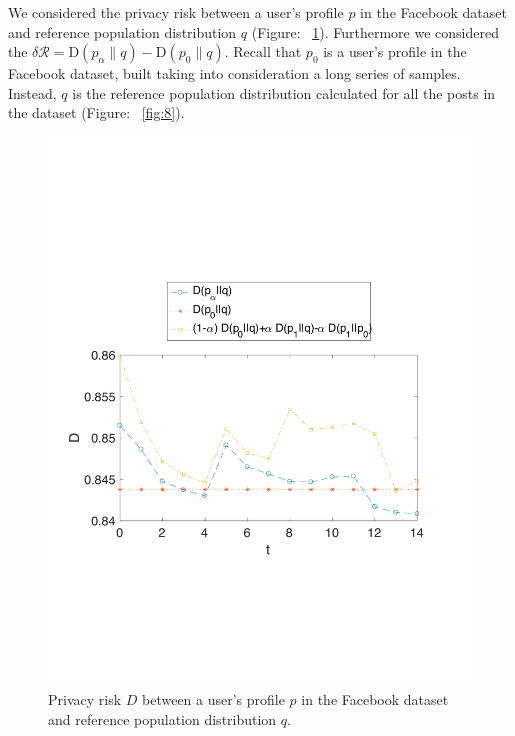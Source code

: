 We considered the privacy risk between a user's profile $p$ in the Facebook dataset and reference population distribution $q$ (Figure: ~\ref{fig:7}). Furthermore we considered the $\delta \mathcal{R} = \text{D}(p_\alpha\|q) - \text{D}(p_0\|q)$. Recall that $p_0$ is a user's profile in the Facebook dataset, built taking into consideration a long series of samples. Instead, $q$ is the reference population distribution calculated for all the posts in the dataset (Figure: ~\ref{fig:8}).

\begin{figure}[htb]
\centering
\includegraphics[scale=0.5]{figures/experiment1.pdf}
\caption{Privacy risk $D$ between a user's profile $p$ in the Facebook dataset and reference population distribution $q$.}
\label{fig:7}
\end{figure}

